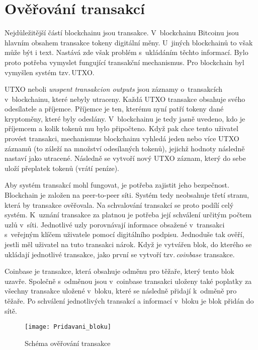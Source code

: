 \documentclass[12pt]{report}			%
\begin{document}
		\section{Ověřování transakcí}{
Nejdůležitější částí blockchainu jsou transakce. V~blockchainu Bitcoinu jsou hlavním obsahem transakce tokeny digitální měny. U~jiných blockchainů to však může být i text. Nastává zde však problém s~ukládáním těchto informací. Bylo proto potřeba vymyslet fungující transakční mechanismus. Pro blockchain byl vymyšlen systém tzv.\,UTXO.

UTXO neboli \textit{unspent transakcion outputs} jsou záznamy o~transakcích v~blockchainu, které nebyly utraceny. Každá UTXO transakce obsahuje svého odesílatele a příjemce. Příjemce je ten, kterému nyní patří tokeny dané kryptoměny, které byly odeslány. V~blockchainu je tedy jasně uvedeno, kdo je příjemcem a kolik tokenů mu bylo připočteno. Když pak chce tento uživatel provést transakci, mechanismus blockchainu vyhledá jeden nebo více UTXO záznamů (to záleží na množství odesílaných tokenů), jejichž hodnoty následně nastaví jako utracené. Následně se vytvoří nový UTXO záznam, který do sebe uloží přeplatek tokenů (vrátí peníze). 
 
Aby systém transakcí mohl fungovat, je potřeba zajistit jeho bezpečnost. Blockchain je založen na peer-to-peer síti. Systém tedy neobsahuje třetí stranu, která by transakce ověřovala. Na schvalování transakcí se proto podílí celý systém. K~uznání transakce za platnou je potřeba její schválení určitým počtem uzlů v~síti. Jednotlivé uzly porovnávají informace obsažené v~transakci s~veřejným klíčem uživatele pomocí digitálního podpisu. Jednoduše tak ověří, jestli měl uživatel na tuto transakci nárok. Když je vytvářen blok, do kterého se ukládají jednotlivé transakce, jako první se vytvoří tzv.\,\textit{coinbase} transakce. 

Coinbase je transakce, která obsahuje odměnu pro těžaře, který tento blok uzavře. Společně s~odměnou jsou v~coinbase transakci uloženy také poplatky za všechny transakce uložené v~bloku, které se následně přidají k~odměně pro těžaře. Po schválení jednotlivých transakcí a informací v~bloku je blok přidán do sítě. \cite{Bashir2018}\cite{Antonopoulos2017}
		}
\begin{figure}[h]
\caption{Schéma ověřování transakce \cite{Nakamoto2008}}
\texttt{[image: Pridavani\_bloku]}	
\centering
\label{Pridavani_bloku}
\end{figure}
\end{document}
